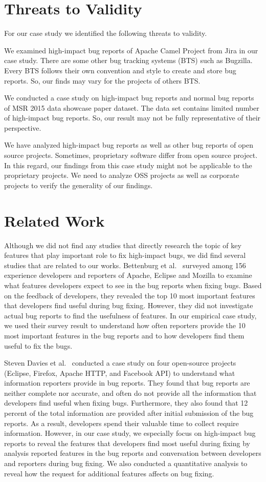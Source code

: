 \documentclass[conference]{IEEEtran}
\begin{document}
 \section{Threats to Validity}
 For our case study we identified the following threats to validity.

 We examined high-impact bug reports of Apache Camel Project from Jira in our case study. There are some other bug tracking systems (BTS) such as Bugzilla. Every BTS follows their own convention and style to create and store bug reports. So, our finds may vary for the projects of others BTS.

We conducted a case study on high-impact bug reports and normal bug reports of MSR 2015 data showcase paper dataset. The data set contains limited number of high-impact bug reports. So, our result may not be fully representative of their perspective.
 
We have analyzed high-impact bug reports as well as other bug reports of open source projects. Sometimes, proprietary software differ from open source project. In this regard, our findings from this case study might not be applicable to the proprietary projects. We need to analyze OSS projects as well as corporate projects to verify the generality of our findings.
\section{Related Work}
Although we did not find any studies that directly research the topic of key features that play important role to fix high-impact bugs, we did find several studies that are related to our works.
Bettenburg et al.~\cite{Bettenburg:2008} surveyed among 156 experience developers and reporters of Apache, Eclipse and Mozilla to examine what features developers expect to see in the bug reports when fixing bugs. Based on the feedback of developers, they revealed the top 10 most important features that developers find useful during bug fixing. However, they did not investigate actual bug reports to find the usefulness of features. In our empirical case study, we used their survey result to understand how often reporters provide the 10 most important features in the bug reports and to how developers find them useful to fix the bugs. 
	
Steven Davies et al.~\cite{Davies:2014} conducted a case study on four open-source projects (Eclipse, Firefox, Apache HTTP, and Facebook API) to understand what information reporters provide in bug reports. They found that bug reports are neither complete nor accurate, and often do not provide all the information that developers find useful when fixing bugs. Furthermore, they also found that 12 percent of the total information are provided after initial submission of the bug reports. As a result, developers spend their valuable time to collect require information. However, in our case study, we especially focus on high-impact bug reports to reveal the features that developers find most useful during fixing by analysis reported features in the bug reports and conversation between developers and reporters during bug fixing. We also conducted a quantitative analysis to reveal how the request for additional features affects on bug fixing. 
\end{document}
